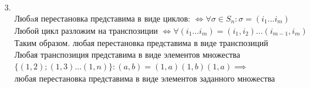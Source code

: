 \documentclass{article}
\author{Бугрий Илья M3134}
\date{November 2023}
\begin{document}
\begin{enumerate}
    \item [3.] 
    \begin{align*}
        &\text{Любaя перестановка представима в виде циклов: } \Leftrightarrow \forall \sigma \in S_n: \sigma = (i_1 \dots i_m) \\
        &\text{Любой цикл разложим на транспозиции } \Leftrightarrow \forall (i_1 \dots i_m) = (i_1, i_2) \dots (i_{m-1} , i_m) \\
        &\text{Таким образом. любая перестановка представима в виде транспозиций} \\
        &\text{Любая транспозиция представима в виде элементов множества }\\
        & \{(1, 2); (1, 3) \dots (1, n)\}: (a, b) = (1, a)(1, b)(1, a) \implies \\& \text{любая перестановка представима в
         виде элементов заданного множества}
    \end{align*}

\end{enumerate}
\end{document}
